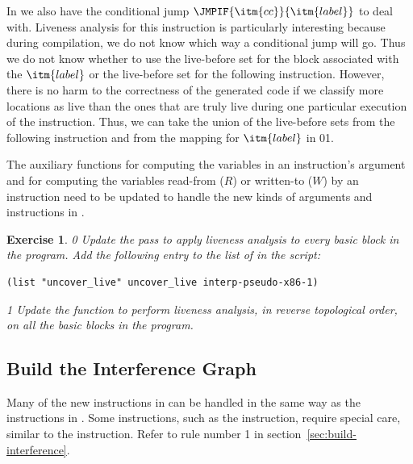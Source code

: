 \documentclass[7x10]{TimesAPriori_MIT}%
\def\racketEd{0}
\def\pythonEd{1}
\def\edition{0}
\newcommand{\racket}[1]{{\if\edition\racketEd{#1}\fi}}
\newcommand{\python}[1]{{\if\edition\pythonEd #1\fi}}
\newtheorem{exercise}[theorem]{Exercise}
\numberwithin{theorem}{chapter}
\numberwithin{definition}{chapter}
\numberwithin{equation}{chapter}
\begin{document}
In \LangXIfVar{} we also have the conditional jump
$\JMPIF{\itm{cc}}{\itm{label}}$ to deal with.  Liveness analysis for
this instruction is particularly interesting because during
compilation, we do not know which way a conditional jump will go. Thus
we do not know whether to use the live-before set for the block
associated with the $\itm{label}$ or the live-before set for the
following instruction.  However, there is no harm to the correctness
of the generated code if we classify more locations as live than the
ones that are truly live during one particular execution of the
instruction. Thus, we can take the union of the live-before sets from
the following instruction and from the mapping for $\itm{label}$ in
\racket{}\python{}.

The auxiliary functions for computing the variables in an
instruction's argument and for computing the variables read-from ($R$)
or written-to ($W$) by an instruction need to be updated to handle the
new kinds of arguments and instructions in \LangXIfVar{}.

\begin{exercise}\normalfont\normalsize
{\if\edition\racketEd
%
Update the  pass to apply liveness analysis to
every basic block in the program.
%
Add the following entry to the list of  in the
 script:
\begin{lstlisting}
(list "uncover_live" uncover_live interp-pseudo-x86-1)
\end{lstlisting}
\fi}

{\if\edition\pythonEd
%
Update the  function to perform liveness analysis,
in reverse topological order, on all the basic blocks in the
program.
%  
\fi}
\end{exercise}

\subsection{Build the Interference Graph}
\label{sec:build-interference-Lif}

Many of the new instructions in \LangXIfVar{} can be handled in the
same way as the instructions in \LangXVar{}.
%
Some instructions, such as the  instruction, require special care,
similar to the  instruction. Refer to rule number 1 in
section~\ref{sec:build-interference}.
\end{document}
